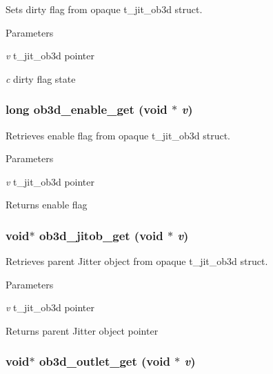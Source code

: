 Sets dirty flag from opaque t\_\-jit\_\-ob3d struct. 
\begin{DoxyParams}{Parameters}
\item[{\em v}]t\_\-jit\_\-ob3d pointer \item[{\em c}]dirty flag state \end{DoxyParams}
\hypertarget{group__ob3dmod_ga79941da00228379d7e9bcc7cfd293385}{
\subsubsection[{ob3d\_\-enable\_\-get}]{\setlength{\rightskip}{0pt plus 5cm}long ob3d\_\-enable\_\-get (void $\ast$ {\em v})}}
\label{group__ob3dmod_ga79941da00228379d7e9bcc7cfd293385}


Retrieves enable flag from opaque t\_\-jit\_\-ob3d struct. 
\begin{DoxyParams}{Parameters}
\item[{\em v}]t\_\-jit\_\-ob3d pointer\end{DoxyParams}
\begin{DoxyReturn}{Returns}
enable flag 
\end{DoxyReturn}
\hypertarget{group__ob3dmod_ga71e817dad96e4b3fc54dbf3e97308b5a}{
\subsubsection[{ob3d\_\-jitob\_\-get}]{\setlength{\rightskip}{0pt plus 5cm}void$\ast$ ob3d\_\-jitob\_\-get (void $\ast$ {\em v})}}
\label{group__ob3dmod_ga71e817dad96e4b3fc54dbf3e97308b5a}


Retrieves parent Jitter object from opaque t\_\-jit\_\-ob3d struct. 
\begin{DoxyParams}{Parameters}
\item[{\em v}]t\_\-jit\_\-ob3d pointer\end{DoxyParams}
\begin{DoxyReturn}{Returns}
parent Jitter object pointer 
\end{DoxyReturn}
\hypertarget{group__ob3dmod_ga1d44805174bf6e277a042d9644631f84}{
\subsubsection[{ob3d\_\-outlet\_\-get}]{\setlength{\rightskip}{0pt plus 5cm}void$\ast$ ob3d\_\-outlet\_\-get (void $\ast$ {\em v})}}
\label{group__ob3dmod_ga1d44805174bf6e277a042d9644631f84}


